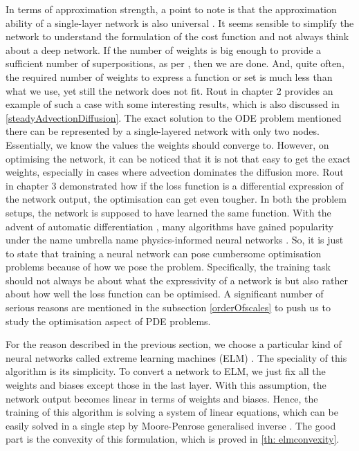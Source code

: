 \documentclass{article}
\begin{document}
In terms of approximation strength, a point to note is that the approximation ability of a single-layer network is also universal \cite{Cybenko1989ApproximationBS, bach2008consistency}. It seems sensible to simplify the network to understand the formulation of the cost function and not always think about a deep network. If the number of weights is big enough to provide a sufficient number of superpositions, as per \cite{Cybenko1989ApproximationBS}, then we are done. And, quite often, the required number of weights to express a function or set is much less than what we use, yet still the network does not fit. Rout \cite{rout2019numerical} in chapter 2 provides an example of such a case with some interesting results, which is also discussed in \cref{steadyAdvectionDiffusion}. The exact solution to the ODE problem mentioned there can be represented by a single-layered network with only two nodes. Essentially, we know the values the weights should converge to. However, on optimising the network, it can be noticed that it is not that easy to get the exact weights, especially in cases where advection dominates the diffusion more. Rout \cite{rout2019numerical} in chapter 3 demonstrated how if the loss function is a differential expression of the network output, the optimisation can get even tougher. In both the problem setups, the network is supposed to have learned the same function. With the advent of automatic differentiation \cite{baydin2018automatic}, many algorithms have gained popularity under the name umbrella name physics-informed neural networks \cite{cuomo2022scientific}. So, it is just to state that training a neural network can pose cumbersome optimisation problems because of how we pose the problem. Specifically, the training task should not always be about what the expressivity of a network is but also rather about how well the loss function can be optimised. A significant number of serious reasons are mentioned in the subsection \cref{orderOfscales} to push us to study the optimisation aspect of PDE problems.       

For the reason described in the previous section, we choose a particular kind of neural networks called extreme learning machines (ELM) \cite{huang2006extreme}. The speciality of this algorithm is its simplicity. To convert a network to ELM, we just fix all the weights and biases except those in the last layer. With this assumption, the network output becomes linear in terms of weights and biases. Hence, the training of this algorithm is solving a system of linear equations, which can be easily solved in a single step by Moore-Penrose generalised inverse \cite{rao1972generalized}. The good part is the convexity of this formulation, which is proved in \cref{th: elmconvexity}.
\end{document}

